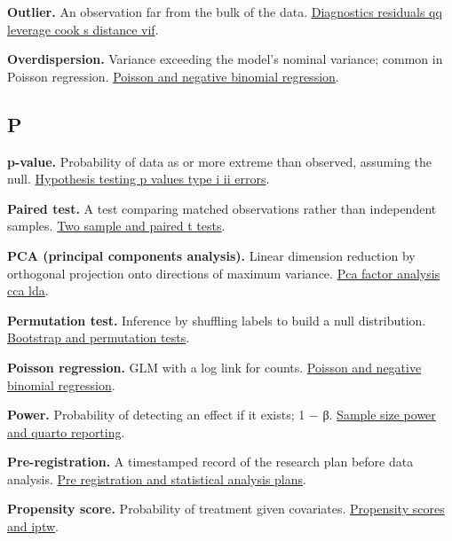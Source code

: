 \documentclass[
]{article}
\begin{document}
\textbf{Outlier.} An observation far from the bulk of the data.
\href{../chapters/07-regression/labs/lab-diagnostics-residuals-qq-leverage-cook-s-distance-vif.Rmd}{Diagnostics
residuals qq leverage cook s distance vif}.

\textbf{Overdispersion.} Variance exceeding the model's nominal
variance; common in Poisson regression.
\href{../chapters/07-regression/labs/lab-poisson-and-negative-binomial-regression.Rmd}{Poisson
and negative binomial regression}.

\subsection{P}\label{p}

\textbf{p-value.} Probability of data as or more extreme than observed,
assuming the null.
\href{../chapters/04-inferential/labs/lab-hypothesis-testing-p-values-type-i-ii-errors.Rmd}{Hypothesis
testing p values type i ii errors}.

\textbf{Paired test.} A test comparing matched observations rather than
independent samples.
\href{../chapters/04-inferential/labs/lab-two-sample-and-paired-t-tests.Rmd}{Two
sample and paired t tests}.

\textbf{PCA (principal components analysis).} Linear dimension reduction
by orthogonal projection onto directions of maximum variance.
\href{../chapters/08-multivariate/labs/lab-pca-factor-analysis-cca-lda.Rmd}{Pca
factor analysis cca lda}.

\textbf{Permutation test.} Inference by shuffling labels to build a null
distribution.
\href{../chapters/04-inferential/labs/lab-bootstrap-and-permutation-tests.Rmd}{Bootstrap
and permutation tests}.

\textbf{Poisson regression.} GLM with a log link for counts.
\href{../chapters/07-regression/labs/lab-poisson-and-negative-binomial-regression.Rmd}{Poisson
and negative binomial regression}.

\textbf{Power.} Probability of detecting an effect if it exists; 1 − β.
\href{../chapters/05-power/labs/lab-sample-size-power-and-quarto-reporting.Rmd}{Sample
size power and quarto reporting}.

\textbf{Pre-registration.} A timestamped record of the research plan
before data analysis.
\href{../chapters/16-design/labs/lab-pre-registration-and-statistical-analysis-plans.Rmd}{Pre
registration and statistical analysis plans}.

\textbf{Propensity score.} Probability of treatment given covariates.
\href{../chapters/16-design/labs/lab-propensity-scores-and-iptw.Rmd}{Propensity
scores and iptw}.
\end{document}
